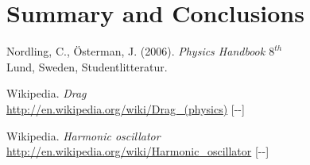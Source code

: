 \documentclass[11pt, a4paper]{article}
\newcommand{\todayswe}{\the\year-\twodigit\month-\twodigit\day}
\begin{document}
\section{Summary and Conclusions}
\vfill

\begin{thebibliography}{99}
	 Nordling, C., Österman, J. (2006). 
  \textit{Physics Handbook  $8^{th}$}\\
  Lund, Sweden, Studentlitteratur.

   Wikipedia. \textit{Drag}\\ 
  \url{http://en.wikipedia.org/wiki/Drag_(physics)} [\todayswe]

   Wikipedia. \textit{Harmonic oscillator}\\ 
  \url{http://en.wikipedia.org/wiki/Harmonic_oscillator} [\todayswe]

\end{thebibliography}

\begin{appendix}
\end{appendix}

\end{document}
